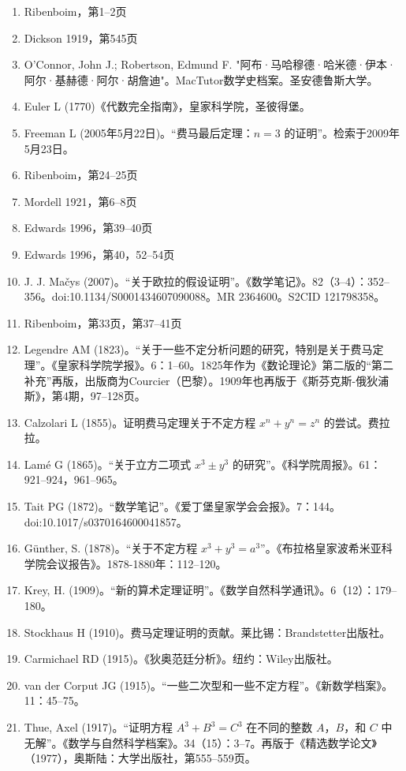 \begin{enumerate}
\item Ribenboim，第1–2页  
\item Dickson 1919，第545页  
\item O'Connor, John J.; Robertson, Edmund F. "阿布·马哈穆德·哈米德·伊本·阿尔·基赫德·阿尔·胡詹迪"。MacTutor数学史档案。圣安德鲁斯大学。  
\item Euler L (1770)《代数完全指南》，皇家科学院，圣彼得堡。  
\item Freeman L (2005年5月22日)。“费马最后定理：\( n = 3 \) 的证明”。检索于2009年5月23日。  
\item Ribenboim，第24–25页  
\item Mordell 1921，第6–8页  
\item Edwards 1996，第39–40页  
\item Edwards 1996，第40，52–54页  
\item J. J. Mačys (2007)。“关于欧拉的假设证明”。《数学笔记》。82（3–4）：352–356。doi:10.1134/S0001434607090088。MR 2364600。S2CID 121798358。
\item Ribenboim，第33页，第37–41页  
\item Legendre AM (1823)。“关于一些不定分析问题的研究，特别是关于费马定理”。《皇家科学院学报》。6：1–60。1825年作为《数论理论》第二版的“第二补充”再版，出版商为Courcier（巴黎）。1909年也再版于《斯芬克斯-俄狄浦斯》，第4期，97–128页。  
\item Calzolari L (1855)。证明费马定理关于不定方程 \( x^n + y^n = z^n \) 的尝试。费拉拉。  
\item Lamé G (1865)。“关于立方二项式 \( x^3 \pm y^3 \) 的研究”。《科学院周报》。61：921–924，961–965。  
\item Tait PG (1872)。“数学笔记”。《爱丁堡皇家学会会报》。7：144。doi:10.1017/s0370164600041857。  
\item Günther, S. (1878)。“关于不定方程 \( x^3 + y^3 = a^3 \)”。《布拉格皇家波希米亚科学院会议报告》。1878-1880年：112–120。  
\item Krey, H. (1909)。“新的算术定理证明”。《数学自然科学通讯》。6（12）：179–180。  
\item Stockhaus H (1910)。费马定理证明的贡献。莱比锡：Brandstetter出版社。  
\item Carmichael RD (1915)。《狄奥范廷分析》。纽约：Wiley出版社。  
\item van der Corput JG (1915)。“一些二次型和一些不定方程”。《新数学档案》。11：45–75。
\item Thue, Axel (1917)。“证明方程 \( A^3 + B^3 = C^3 \) 在不同的整数 \( A \)，\( B \)，和 \( C \) 中无解”。《数学与自然科学档案》。34（15）：3–7。再版于《精选数学论文》（1977），奥斯陆：大学出版社，第555–559页。  

\end{enumerate}
